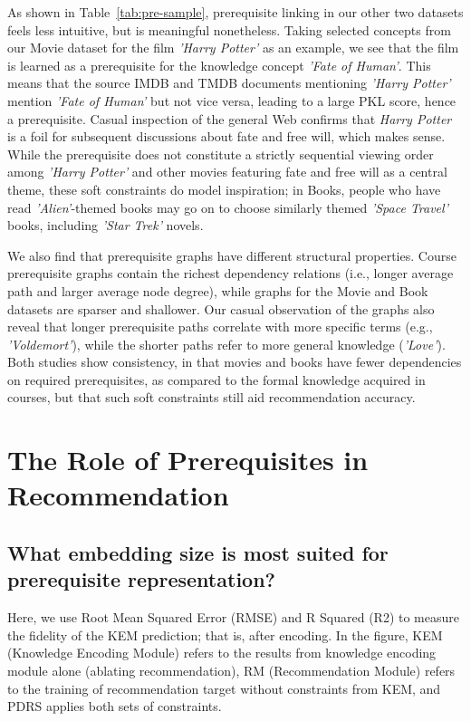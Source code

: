 As shown in Table~\ref{tab:pre-sample}, prerequisite linking in our other two datasets feels less intuitive, but is meaningful nonetheless. Taking selected concepts from our Movie dataset for the film \textit{'Harry Potter'} as an example, we see that the film is learned as a prerequisite for the knowledge concept \textit{'Fate of Human'}.  This means that the source IMDB and TMDB documents mentioning \textit{'Harry Potter'} mention {\it 'Fate of Human'} but not vice versa, leading to a large PKL score, hence a prerequisite.  Casual inspection of the general Web confirms that {\it Harry Potter} is a foil for subsequent discussions about fate and free will, which makes sense.  While the prerequisite does not constitute a strictly sequential viewing order among {\it 'Harry Potter'} and other movies featuring fate and free will as a central theme, these soft constraints do model inspiration; in Books, people who have read \textit{'Alien'}-themed books may go on to choose similarly themed \textit{'Space Travel'} books, including \textit{'Star Trek'} novels.

We also find that prerequisite graphs have different structural properties. Course prerequisite graphs contain the richest dependency relations (i.e., longer average path and larger average node degree), while graphs for the Movie and Book datasets are sparser and shallower.
Our casual observation of the graphs also reveal that longer prerequisite paths correlate with more specific terms (e.g., {\it 'Voldemort'}), while the shorter paths refer to more general knowledge ({\it 'Love'}).
Both studies show consistency, in that movies and books have fewer dependencies on required prerequisites, as compared to the formal knowledge acquired in courses, but that such soft constraints still aid recommendation accuracy.

\section{The Role of Prerequisites in Recommendation}
\label{appendix:cases}
\subsection{What embedding size is most suited for prerequisite representation?} Here, we use Root Mean Squared Error (RMSE) and R Squared (R2) to measure the fidelity of the KEM prediction; that is, after encoding.  In the figure, KEM (Knowledge Encoding Module) refers to the results from knowledge encoding module alone (ablating recommendation), RM (Recommendation Module) refers to the training of recommendation target without constraints from KEM, and PDRS applies both sets of constraints.

